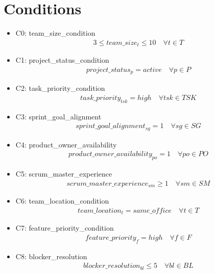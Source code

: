 \documentclass{article}
\begin{document}
\section{Conditions}
\begin{itemize}
    \item C0: team\_size\_condition
        \begin{align*}
            3 \leq team\_size_{t} \leq 10 \quad \forall t \in T
        \end{align*}
    \item C1: project\_status\_condition
        \begin{align*}
            project\_status_{p} = active \quad \forall p \in P
        \end{align*}
    \item C2: task\_priority\_condition
        \begin{align*}
            task\_priority_{tsk} = high \quad \forall tsk \in TSK
        \end{align*}
    \item C3: sprint\_goal\_alignment
        \begin{align*}
            sprint\_goal\_alignment_{sg} = 1 \quad \forall sg \in SG
        \end{align*}
    \item C4: product\_owner\_availability
        \begin{align*}
            product\_owner\_availability_{po} = 1 \quad \forall po \in PO
        \end{align*}
    \item C5: scrum\_master\_experience
        \begin{align*}
            scrum\_master\_experience_{sm} \geq 1 \quad \forall sm \in SM
        \end{align*}
    \item C6: team\_location\_condition
        \begin{align*}
            team\_location_{t} = same\_office \quad \forall t \in T
        \end{align*}
    \item C7: feature\_priority\_condition
        \begin{align*}
            feature\_priority_{f} = high \quad \forall f \in F
        \end{align*}
    \item C8: blocker\_resolution
        \begin{align*}
            blocker\_resolution_{bl} \leq 5 \quad \forall bl \in BL

\end{align*}
\end{itemize}
\end{document}
